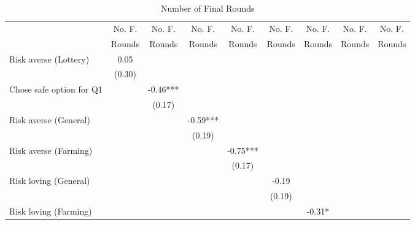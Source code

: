 \begin{table}[htbp]
\centering
\hspace*{-1.2cm}
\begin{threeparttable}
\small
\caption{Number of Final Rounds}
\label{tab:B6}
\begin{tabular}{l cccccccc}
\hline
\hline
& No. F. & No. F. & No. F. & No. F. & No. F. & No. F. & No. F. & No. F. \\
& Rounds & Rounds & Rounds & Rounds & Rounds & Rounds & Rounds & Rounds  \\ \hline
Risk averse (Lottery)&        0.05   &               &               &               &               &               &               &               \\
                    &      (0.30)   &               &               &               &               &               &               &               \\
Chose safe option for Q1&               &       -0.46***&               &               &               &               &               &               \\
                    &               &      (0.17)   &               &               &               &               &               &               \\
Risk averse (General)&               &               &       -0.59***&               &               &               &               &               \\
                    &               &               &      (0.19)   &               &               &               &               &               \\
Risk averse (Farming)&               &               &               &       -0.75***&               &               &               &               \\
                    &               &               &               &      (0.17)   &               &               &               &               \\
Risk loving (General)&               &               &               &               &       -0.19   &               &               &               \\
                    &               &               &               &               &      (0.19)   &               &               &               \\
Risk loving (Farming)&               &               &               &               &               &       -0.31*  &               &               \\

\end{tabular}
\end{threeparttable}
\end{table}
